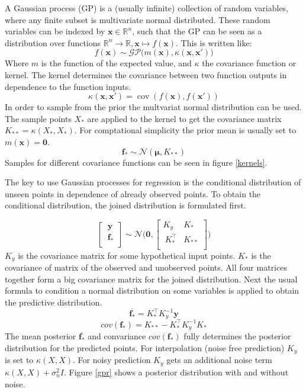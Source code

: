 \documentclass[english]{article}
\newcommand{\x}{\mathbf{x}}
\begin{document}
A Gaussian process (GP) is a (usually infinite) collection of random variables, where any finite subset is multivariate normal distributed. These random variables can be indexed by $\x \in \mathbb{R}^n$, such that the GP can be seen as a distribution over functions $\mathbb{R}^n \rightarrow \mathbb{R}, \x \mapsto f(\x)$. This is written like:
$$f(\mathbf{x}) \sim \mathcal{GP}\big(m(\mathbf{x}), \kappa(\mathbf{x},\mathbf{x}')\big)$$
Where $m$ is the function of the expected value, and $\kappa$ the covariance function or kernel. The kernel determines the covariance between two function outputs in dependence to the function inputs.
$$\kappa(\mathbf{x},\mathbf{x}') = \operatorname{cov}(f(\mathbf{x}),f(\mathbf{x}'))$$
In order to sample from the prior the multvariat normal distribution can be used. The sample points $X_*$ are applied to the kernel to get the covariance matrix $K_{**} = \kappa(X_*,X_*)$. For comptational simplicity the prior mean is usually set to $m(\mathbf{x}) = \mathbf{0}$.
$$\mathbf{f_*} \sim \mathcal{N}(\mathbf{\mathbf{\mu}}, K_{**})$$
Samples for different covariance functions can be seen in figure \ref{kernels}.

The key to use Gaussian processes for regression is the conditional distribution of unseen points in dependence of already observed points.
To obtain the conditional distribution, the joined distribution is formulated first.

$$
\begin{bmatrix}
\ \mathbf{y}\ \\
\ \mathbf{f_*} \\
\end{bmatrix}
\sim \mathcal{N} \Bigg(\mathbf{0},
\begin{bmatrix}
K_y & K_* \\
\ K^{\top}_{*} & K_{**}  \\
\end{bmatrix}
\Bigg)
$$
$K_y$ is the covariance matrix for some hypothetical input points. $K_*$ is the covariance of matrix of the observed and unobserved points. All four matrices together form a big covariance matrix for the joined distribution. Next the usual formula to condition a normal distribution on some variables is applied to obtain the predictive distribution.
$$\overline{\mathbf{f_*}} = K_*^\top K_y^{-1}\mathbf{y}$$
$$cov(\mathbf{f_*}) = K_{**} - K_*^\top K_y^{-1} K_*$$
The mean posterior $\overline{\mathbf{f_*}}$ and convariance $cov(\mathbf{f_*})$ fully determines the posterior distribution for the predicted points. For interpolation (noise free prediction) $K_y$ is set to  $\kappa(X,X)$. For noisy prediction $K_y$ gets an additional noise term $\kappa(X,X) + \sigma_n^2I$. Figure \ref{gpr} shows a posterior distribution with and without noise.
\end{document}
